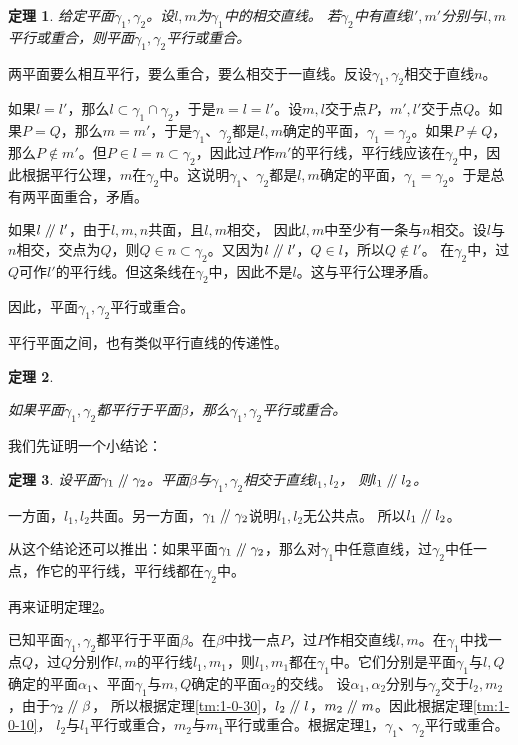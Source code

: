 \documentclass[12pt,UTF8]{ctexbook}
\newtheorem{tm}{定理}[section]
\renewcommand\parallel{\mathrel{/\mskip-4mu/}}
\begin{document}
\begin{tm}\label{tm:1-0-70}
    给定平面$\gamma_1, \gamma_2$。设$l,m$为$\gamma_1$中的相交直线。
    若$\gamma_2$中有直线$l',m'$分别与$l,m$平行或重合，则平面$\gamma_1, \gamma_2$平行或重合。
\end{tm}
\begin{proof2}
    两平面要么相互平行，要么重合，要么相交于一直线。反设$\gamma_1, \gamma_2$相交于直线$n$。

    如果$l=l'$，那么$l\subset \gamma_1\cap\gamma_2$，于是$n=l=l'$。设$m,l$交于点$P$，$m',l'$交于点$Q$。如果$P=Q$，那么$m=m'$，于是$\gamma_1$、$\gamma_2$都是$l,m$确定的平面，$\gamma_1=\gamma_2$。如果$P\neq Q$，那么$P\notin m'$。但$P\in l=n\subset\gamma_2$，因此过$P$作$m'$的平行线，平行线应该在$\gamma_2$中，因此根据平行公理，$m$在$\gamma_2$中。这说明$\gamma_1$、$\gamma_2$都是$l,m$确定的平面，$\gamma_1=\gamma_2$。于是总有两平面重合，矛盾。

    如果$l\parallel l'$，由于$l,m,n$共面，且$l,m$相交，
    因此$l,m$中至少有一条与$n$相交。设$l$与$n$相交，交点为$Q$，则$Q\in n\subset\gamma_2$。又因为$l\parallel l'$，$Q\in l$，所以$Q\notin l'$。
    在$\gamma_2$中，过$Q$可作$l'$的平行线。但这条线在$\gamma_2$中，因此不是$l$。这与平行公理矛盾。

    因此，平面$\gamma_1, \gamma_2$平行或重合。
\end{proof2}
平行平面之间，也有类似平行直线的传递性。
\begin{tm}\label{tm:1-0-80}

如果平面$\gamma_1,\gamma_2$都平行于平面$\beta$，那么$\gamma_1,\gamma_2$平行或重合。
\end{tm}
我们先证明一个小结论：
\begin{tm}\label{tm:1-0-90}
    设平面$\gamma_1\parallel \gamma_2$。平面$\beta$与$\gamma_1,\gamma_2$相交于直线$l_1,l_2$，
    则$l_1\parallel l_2$。
\end{tm}
\begin{proof2}
    一方面，$l_1,l_2$共面。另一方面，$\gamma_1\parallel \gamma_2$说明$l_1,l_2$无公共点。
    所以$l_1\parallel l_2$。
\end{proof2}
从这个结论还可以推出：如果平面$\gamma_1\parallel \gamma_2$，那么对$\gamma_1$中任意直线，过$\gamma_2$中任一点，作它的平行线，平行线都在$\gamma_2$中。

再来证明定理\ref{tm:1-0-80}。
\begin{proof2}
    已知平面$\gamma_1,\gamma_2$都平行于平面$\beta$。在$\beta$中找一点$P$，过$P$作相交直线$l,m$。在$\gamma_1$中找一点$Q$，过$Q$分别作$l,m$的平行线$l_1,m_1$，则$l_1,m_1$都在$\gamma_1$中。它们分别是平面$\gamma_1$与$l,Q$确定的平面$\alpha_1$、平面$\gamma_1$与$m,Q$确定的平面$\alpha_2$的交线。
    设$\alpha_1,\alpha_2$分别与$\gamma_2$交于$l_2,m_2$，由于$\gamma_2\parallel \beta$，
    所以根据定理\ref{tm:1-0-30}，$l_2\parallel l$，$m_2\parallel m$。因此根据定理\ref{tm:1-0-10}，
    $l_2$与$l_1$平行或重合，$m_2$与$m_1$平行或重合。根据定理\ref{tm:1-0-70}，$\gamma_1$、$\gamma_2$平行或重合。
\end{proof2}
\end{document}
